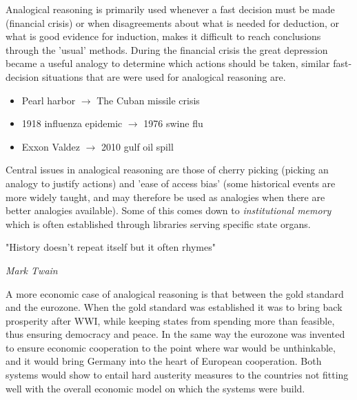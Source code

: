 \documentclass[12pt, a4paper]{article}
\begin{document}
\begin{multicols}{2}
Analogical reasoning is primarily used whenever a fast decision must be made (financial crisis) or when disagreements about what is needed for deduction, or what is good evidence for induction, makes it difficult to reach conclusions through the 'usual' methods. During the financial crisis the great depression became a useful analogy to determine which actions should be taken, similar fast-decision situations that are were used for analogical reasoning are.
\begin{itemize}
\item Pearl harbor $\rightarrow$ The Cuban missile crisis
\item 1918 influenza epidemic $\rightarrow$ 1976 swine flu
\item Exxon Valdez $\rightarrow$ 2010 gulf oil spill
\end{itemize}
Central issues in analogical reasoning are those of cherry picking (picking an analogy to justify actions) and 'ease of access bias' (some historical events are more widely taught, and may therefore be used as analogies when there are better analogies available). Some of this comes down to \textit{institutional memory} which is often established through libraries serving specific state organs. 
\epigraph{"History doesn't repeat itself but it often rhymes"}{\textit{Mark Twain}}
A more economic case of analogical reasoning is that between the gold standard and the eurozone. When the gold standard was established it was to bring back prosperity after WWI, while keeping states from spending more than feasible, thus ensuring democracy and peace. In the same way the eurozone was invented to ensure economic cooperation to the point where war would be unthinkable, and it would bring Germany into the heart of European cooperation. Both systems would show to entail hard austerity measures to the countries not fitting well with the overall economic model on which the systems were build.

\end{multicols}
\end{document}
